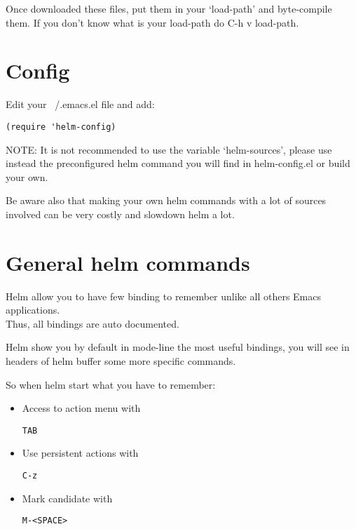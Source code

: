 \documentclass[a4paper,11pt]{article}
\begin{document}
Once downloaded these files, put them in your `load-path' and byte-compile them.
If you don't know what is your load-path do C-h v load-path.

\section{Config}
\label{sec:config}
Edit your ~/.emacs.el file and add:

\begin{verbatim}
(require 'helm-config)
\end{verbatim}


NOTE:
It is not recommended to use the variable `helm-sources', please use instead the preconfigured helm command
you will find in helm-config.el or build your own.

Be aware also that making your own helm commands with a lot of sources involved can be very costly and slowdown
helm a lot.

\section{General helm commands}
\label{sec:gener-anyth-comm}
Helm allow you to have few binding to remember unlike all others Emacs applications.\\
Thus, all bindings are auto documented.

Helm show you by default in mode-line the most useful bindings, you will see in headers of helm buffer some more specific
commands.

So when helm start what you have to remember:

\begin{itemize}
\item Access to action menu with 
\begin{verbatim}
TAB
\end{verbatim}
\end{itemize}
\begin{itemize}
\item Use persistent actions with
\begin{verbatim}
C-z
\end{verbatim}
\end{itemize}
\begin{itemize}
\item Mark candidate with
\begin{verbatim}
M-<SPACE>
\end{verbatim}
\end{itemize}
\end{document}
